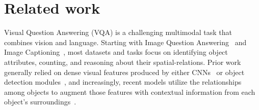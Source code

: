 \section{Related work}


Visual Question Answering (VQA) is a challenging multimodal task that combines vision and language.  Starting with Image Question Answering~\cite{malinowski2014multi,antol2015} and Image Captioning~\cite{karpathy2015deep}, most datasets and tasks focus on identifying object attributes, counting, and reasoning about their spatial-relations. Prior work generally relied on dense visual features produced by either CNNs~\cite{xiong2016dynamic,yang2016stacked} or object detection modules~\cite{desta2018object}, and increasingly, recent models utilize the relationships among objects to augment those features with contextual information from each object’s surroundings~\cite{teney2017graph, santoro2017simple}.  

